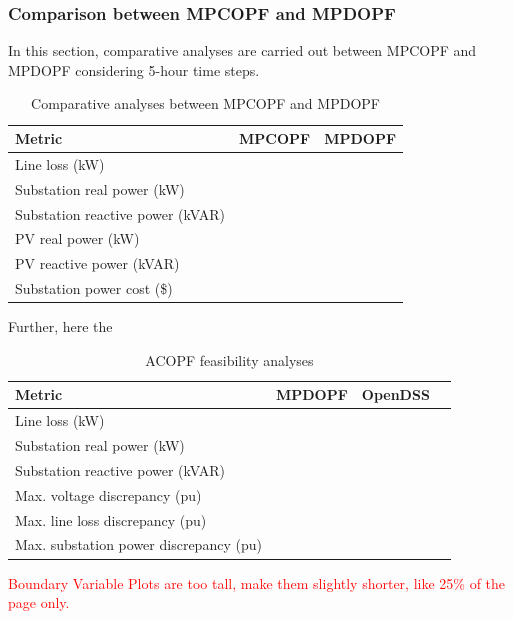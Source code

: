 \documentclass[../../outputs/main.tex]{subfiles}
\begin{document}
\subsubsection{Comparison between MPCOPF and MPDOPF}
In this section, comparative analyses are carried out between MPCOPF and MPDOPF considering 5-hour time steps.


\begin{table}[h!]
    \centering
    \caption{Comparative analyses between MPCOPF and MPDOPF}
    \begin{tabular}{|l|c|c|}
    \hline
    \textbf{Metric} & \textbf{MPCOPF} & \textbf{MPDOPF} \\ \hline
    Line loss (kW) &   &  \\ \hline
    Substation real power (kW) &    &   \\ \hline
    Substation reactive power (kVAR) &    &   \\ \hline
    PV real power (kW) &    &    \\ \hline
    PV reactive power (kVAR) &    &   \\ \hline
    Substation power cost (\$) &     &   \\ \hline
    \end{tabular}
    \label{table:combined_results_slim}
\end{table}


Further, here the 

\begin{table}[h!]
    \centering
    \caption{ACOPF feasibility analyses}
    \begin{tabular}{|l|c|c|c|}
    \hline
    \textbf{Metric} & \textbf{MPDOPF} & \textbf{OpenDSS} \\ \hline
    Line loss (kW) &   &  \\ \hline
    Substation real power (kW) &    &   \\ \hline
    Substation reactive power (kVAR) &    &   \\ \hline
    Max. voltage discrepancy (pu) &    &    \\ \hline
    Max. line loss discrepancy (pu) &    &   \\ \hline
    Max. substation power discrepancy (pu) &     &   \\ \hline
    \end{tabular}
    \label{table:feas-5-}
\end{table}


\textcolor{red}{Boundary Variable Plots are too tall, make them slightly shorter, like 25\% of the page only.}
\end{document}
